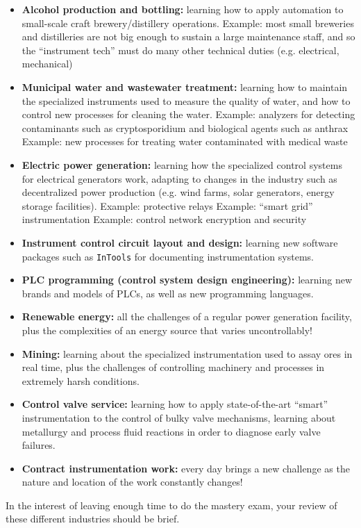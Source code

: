 \begin{itemize}
\itemitem{} Example: most food processing facilities are not big enough to sustain a large maintenance staff, and so the ``instrument tech'' must do many other technical duties (e.g. electrical, mechanical)
\item{} {\bf Alcohol production and bottling:} learning how to apply automation to small-scale craft brewery/distillery operations.
\itemitem{} Example: most small breweries and distilleries are not big enough to sustain a large maintenance staff, and so the ``instrument tech'' must do many other technical duties (e.g. electrical, mechanical)
\item{} {\bf Municipal water and wastewater treatment:} learning how to maintain the specialized instruments used to measure the quality of water, and how to control new processes for cleaning the water.
\itemitem{} Example: analyzers for detecting contaminants such as cryptosporidium and biological agents such as anthrax
\itemitem{} Example: new processes for treating water contaminated with medical waste
\item{} {\bf Electric power generation:} learning how the specialized control systems for electrical generators work, adapting to changes in the industry such as decentralized power production (e.g. wind farms, solar generators, energy storage facilities).
\itemitem{} Example: protective relays
\itemitem{} Example: ``smart grid'' instrumentation
\itemitem{} Example: control network encryption and security
\item{} {\bf Instrument control circuit layout and design:} learning new software packages such as {\tt InTools} for documenting instrumentation systems.
\item{} {\bf PLC programming (control system design engineering):} learning new brands and models of PLCs, as well as new programming languages.
\item{} {\bf Renewable energy:} all the challenges of a regular power generation facility, plus the complexities of an energy source that varies uncontrollably!
\item{} {\bf Mining:} learning about the specialized instrumentation used to assay ores in real time, plus the challenges of controlling machinery and processes in extremely harsh conditions.
\item{} {\bf Control valve service:} learning how to apply state-of-the-art ``smart'' instrumentation to the control of bulky valve mechanisms, learning about metallurgy and process fluid reactions in order to diagnose early valve failures.  
\item{} {\bf Contract instrumentation work:} every day brings a new challenge as the nature and location of the work constantly changes!
\end{itemize}

In the interest of leaving enough time to do the mastery exam, your review of these different industries should be brief.




